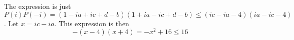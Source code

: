 The expression is just $P(i)P(-i)=(1-ia+ic+d-b)(1+ia-ic+d-b)\le (ic-ia-4)(ia-ic-4)$.
Let $x=ic-ia$. This expression is then
$$-(x-4)(x+4)=-x^2+16\le 16$$
